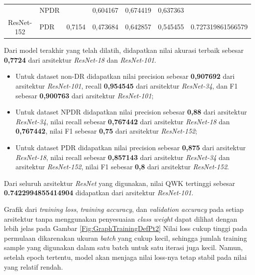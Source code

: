 \begin{table}[hbtp]
\begin{center}
\begin{tabular}{|c|l|c|l|l|l|c|}
			& NPDR                                               &                          & 0,604167                                          & 0,674419                                         & 0,637363                                        &                                      \\ \cline{2-2} \cline{4-6}
			\multirow{-3}{*}{ResNet-152} & PDR                                                & \multirow{-3}{*}{0,7154} & 0,473684                                          & 0,642857                                         & 0,545455                                        & \multirow{-3}{*}{0.727319861566579}  \\ \hline
		\end{tabular}
	\end{center}
\end{table}

Dari model terakhir yang telah dilatih, didapatkan nilai akurasi terbaik sebesar \textbf{0,7724} dari arsitektur \emph{ResNet-18} dan \emph{ResNet-101}.

\begin{itemize}
	
	\item Untuk dataset non-DR didapatkan nilai precision sebesar \textbf{0,907692} dari arsitektur \emph{ResNet-101}, recall \textbf{0,954545} dari arsitektur \emph{ResNet-34}, dan F1 sebesar \textbf{0,900763} dari arsitektur \emph{ResNet-101};
	
	\item Untuk dataset NPDR didapatkan nilai precision sebesar \textbf{0,88} dari arsitektur \emph{ResNet-34}, nilai recall sebesar \textbf{0,767442} dari arsitektur \emph{ResNet-18} dan \textbf{0,767442}, nilai F1 sebesar \textbf{0,75} dari arsitektur \emph{ResNet-152};
	
	\item Untuk dataset PDR didapatkan nilai precision sebesar \textbf{0,875} dari arsitektur \emph{ResNet-18}, nilai recall sebesar \textbf{0,857143} dari arsitektur \emph{ResNet-34} dan arsitektur \emph{ResNet-152}, nilai F1 sebesar \textbf{0,8} dari arsitektur \emph{ResNet-152}.
	
\end{itemize}

Dari seluruh arsitektur \emph{ResNet} yang digunakan, nilai QWK tertinggi sebesar \textbf{0.7422994855414904} didapatkan dari arsitektur \emph{ResNet-101}.

Grafik dari \emph{training loss}, \emph{training accuracy}, dan \emph{validation accuracy} pada setiap arsitektur tanpa menggunakan penyesuaian \emph{class weight} dapat dilihat dengan lebih jelas pada Gambar \ref{Fig:GraphTrainingDefPt2} Nilai loss cukup tinggi pada permulaan dikarenakan ukuran \emph{batch} yang cukup kecil, sehingga jumlah training sample yang digunakan dalam satu batch untuk satu iterasi juga kecil. Namun, setelah epoch tertentu, model akan menjaga nilai loss-nya tetap stabil pada nilai yang relatif rendah.
\pagebreak

